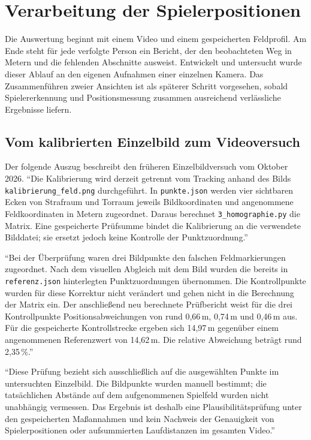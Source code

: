 \clearpage
\section{Verarbeitung der Spielerpositionen}
\label{sec:umsetzung-akpinar}

Die Auswertung beginnt mit einem Video und einem gespeicherten Feldprofil. Am Ende steht für jede verfolgte Person ein Bericht, der den beobachteten Weg in Metern und die fehlenden Abschnitte ausweist. Entwickelt und untersucht wurde dieser Ablauf an den eigenen Aufnahmen einer einzelnen Kamera. Das Zusammenführen zweier Ansichten ist als späterer Schritt vorgesehen, sobald Spielererkennung und Positionsmessung zusammen ausreichend verlässliche Ergebnisse liefern.

\subsection{Vom kalibrierten Einzelbild zum Videoversuch}
Der folgende Auszug beschreibt den früheren Einzelbildversuch vom Oktober 2026.
\enquote{Die Kalibrierung wird derzeit getrennt vom Tracking anhand des Bilds
\lstinline|kalibrierung_feld.png| durchgeführt. In
\lstinline|punkte.json| werden vier sichtbaren Ecken von Strafraum und
Torraum jeweils Bildkoordinaten und angenommene Feldkoordinaten in Metern
zugeordnet. Daraus berechnet \lstinline|3_homographie.py| die Matrix. Eine gespeicherte Prüfsumme bindet die Kalibrierung an
die verwendete Bilddatei; sie ersetzt jedoch keine Kontrolle der
Punktzuordnung.}~\cite{akpinar-codex-20261029c}

\enquote{Bei der Überprüfung waren drei Bildpunkte den falschen Feldmarkierungen
zugeordnet. Nach dem visuellen Abgleich mit dem Bild wurden die bereits
in \lstinline|referenz.json| hinterlegten Punktzuordnungen übernommen.
Die Kontrollpunkte wurden für diese Korrektur nicht verändert und gehen
nicht in die Berechnung der Matrix ein. Der anschließend neu berechnete
Prüfbericht weist für die drei Kontrollpunkte Positionsabweichungen von
rund 0,66\,m, 0,74\,m und 0,46\,m aus. Für die gespeicherte
Kontrollstrecke ergeben sich 14,97\,m gegenüber einem angenommenen
Referenzwert von 14,62\,m. Die relative Abweichung beträgt rund
2,35\,\%.}~\cite{akpinar-codex-20261029c}

\enquote{Diese Prüfung bezieht sich ausschließlich auf die ausgewählten Punkte
im untersuchten Einzelbild. Die Bildpunkte wurden manuell bestimmt;
die tatsächlichen Abstände auf dem aufgenommenen Spielfeld wurden nicht
unabhängig vermessen. Das Ergebnis ist deshalb eine Plausibilitätsprüfung
unter den gespeicherten Maßannahmen und kein Nachweis der Genauigkeit
von Spielerpositionen oder aufsummierten Laufdistanzen im gesamten Video.}~\cite{akpinar-codex-20261029c}

